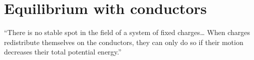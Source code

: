 \section{Equilibrium with conductors}

``There is no stable spot in the field of a system of fixed charges\ldots
When charges redistribute themselves on the conductors,
they can only do so if their motion decreases their total potential energy.''

